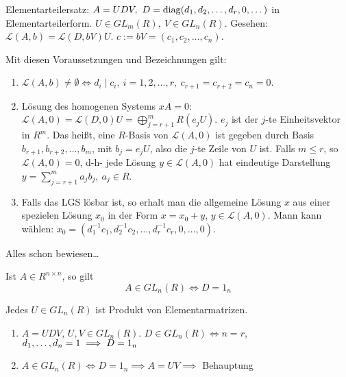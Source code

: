 \documentclass[a4paper,twoside,DIV15,BCOR12mm]{scrbook}
\begin{document}
Elementarteilersatz: $A=UDV,\ D=\diag(d_1,d_2,\dotsc,d_r,0,\dotsc)$
in Elementarteilerform. $U\in GL_m(R),\ V\in GL_n(R)$. Gesehen:
$\mathcal{L}(A,b)=\mathcal{L}(D,bV) U$.
$c:=bV=(c_1,c_2,\dotsc,c_n)$.
\begin{satz}\label{satz:LGS}
    Mit diesen Voraussetzungen und Bezeichnungen gilt:
    \begin{enumerate}
        \item $\mathcal{L}(A,b)\neq \emptyset \iff d_i\mid c_i,\
        i=1,2,\dotsc,r,\ c_{r+1}=c_{r+2}=c_n=0$.
        \item Lösung des homogenen Systems $xA=0$:\\
        $\mathcal{L}(A,0)=\mathcal{L}(D,0)U=\bigoplus_{j=r+1}^m R
        (e_jU)$. $e_j$ ist der $j$-te Einheitsvektor in $R^m$. Das
        heißt, eine $R$-Basis von $\mathcal{L}(A,0)$ ist gegeben
        durch Basis $b_{r+1},b_{r+2},\dotsc,b_m$, mit $b_j=e_jU$,
        also die $j$-te Zeile von $U$ ist. Falls $m\leq r$, so
        $\mathcal{L}(A,0)=0$, d-h- jede Lösung
        $y\in\mathcal{L}(A,0)$
        hat eindeutige Darstellung $y=\sum_{j=r+1}^m a_j b_j,\ a_j
        \in R$.
        \item Falls das LGS lösbar ist, so erhalt man die allgemeine
        Lösung $x$ aus einer spezielen Lösung $x_0$ in der Form
        $x=x_0+y$, $y\in \mathcal{L}(A,0)$. Mann kann wählen:
        $x_0=(d_1^{-1} c_1,d_2^{-1} c_2,\dotsc,d_r^{-1}
        c_r,0,\dotsc,0)$.
    \end{enumerate}
\end{satz}
\begin{beweis}
    Alles schon bewiesen\dots
\end{beweis}

\begin{bemerkungen}
\item Ist $A\in R^{n\times n}$, so gilt
\[ A\in GL_n(R) \iff D=1_n \]
\item Jedes $U\in GL_n(R)$ ist Produkt von Elementarmatrizen.
\end{bemerkungen}

\begin{beweis}
\begin{enumerate}
\item $A=UDV$, $U,V \in GL_n(R)$. $D\in GL_n(R) \iff n=r$, $d_1,\ldots,d_n=1\implies D=1_n$
\item $A\in GL_n(R) \iff D=1_n \implies A=UV \implies$ Behauptung
\end{enumerate}
\end{beweis}
\end{document}
